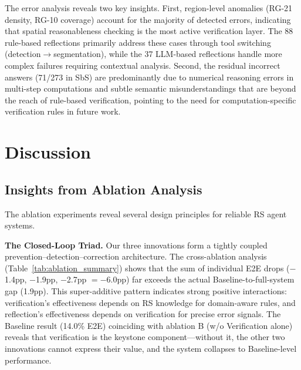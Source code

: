 \documentclass[journal]{IEEEtran}
\begin{document}
The error analysis reveals two key insights.
First, region-level anomalies (RG-21 density, RG-10 coverage) account for the majority of detected errors, indicating that spatial reasonableness checking is the most active verification layer.
The 88 rule-based reflections primarily address these cases through tool switching (detection$\rightarrow$segmentation), while the 37 LLM-based reflections handle more complex failures requiring contextual analysis.
Second, the residual incorrect answers (71/273 in SbS) are predominantly due to numerical reasoning errors in multi-step computations and subtle semantic misunderstandings that are beyond the reach of rule-based verification, pointing to the need for computation-specific verification rules in future work.


\section{Discussion}
\label{sec:discussion}

\subsection{Insights from Ablation Analysis}

The ablation experiments reveal several design principles for reliable RS agent systems.

\textbf{The Closed-Loop Triad.}
Our three innovations form a tightly coupled prevention--detection--correction architecture.
The cross-ablation analysis (Table~\ref{tab:ablation_summary}) shows that the sum of individual E2E drops ($-$1.4pp, $-$1.9pp, $-$2.7pp $= -$6.0pp) far exceeds the actual Baseline-to-full-system gap (1.9pp).
This super-additive pattern indicates strong positive interactions: verification's effectiveness depends on RS knowledge for domain-aware rules, and reflection's effectiveness depends on verification for precise error signals.
The Baseline result (14.0\% E2E) coinciding with ablation B (w/o Verification alone) reveals that verification is the keystone component---without it, the other two innovations cannot express their value, and the system collapses to Baseline-level performance.
\end{document}
